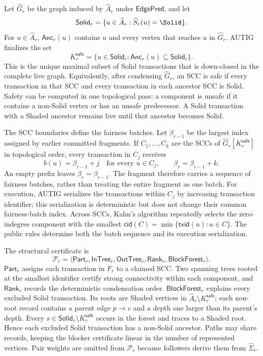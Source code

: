 Let $\widehat G_r$ be the graph induced by $\widehat A_r$ under
$\mathsf{EdgePred}$, and let
\[
 \mathsf{Solid}_r=\{u\in\widehat A_r:\widehat S_r(u)=\Solid\}.
\]
For $u\in\widehat A_r$, $\mathsf{Anc}_r(u)$ contains $u$ and every vertex
that reaches $u$ in $\widehat G_r$.  AUTIG finalizes the set
\[
 K_r^{\mathsf{safe}}
   =\{u\in\mathsf{Solid}_r:
          \mathsf{Anc}_r(u)\subseteq\mathsf{Solid}_r\}.
 \tag{11}\label{eq:safe-closure}
\]
This is the unique maximal subset of Solid transactions that is down-closed
in the complete live graph.  Equivalently, after condensing
$\widehat G_r$, an SCC is safe if every transaction in that SCC and every
transaction in each ancestor SCC is Solid.  Safety can be computed in one
topological pass: a component is unsafe if it contains a non-Solid vertex or
has an unsafe predecessor.  A Solid transaction with a Shaded ancestor
remains live until that ancestor becomes Solid.

The SCC boundaries define the fairness batches.  Let $\beta_{r-1}$ be the
largest index assigned by earlier committed fragments.  If
$C_1,\ldots,C_k$ are the SCCs of
$\widehat G_r[K_r^{\mathsf{safe}}]$ in topological order, every transaction in
$C_j$ receives
\[
 b(u)=\beta_{r-1}+j\quad\text{for every }u\in C_j,
 \qquad \beta_r=\beta_{r-1}+k.
\]
An empty prefix leaves $\beta_r=\beta_{r-1}$.  The fragment therefore carries
a sequence of fairness batches, rather than treating the entire fragment as
one batch.  For execution, AUTIG serializes the transactions within $C_j$ by
increasing transaction identifier; this serialization is deterministic but
does not change their common fairness-batch index.  Across SCCs, Kahn's
algorithm repeatedly selects the zero-indegree component with the smallest
$\mathsf{cid}(C)=\min\{\mathsf{txid}(u):u\in C\}$.  The public rules determine
both the batch sequence and its execution serialization.

The structural certificate is
\[
 \mathcal P_r=\langle\mathsf{Part}_r,\mathsf{InTree}_r,
 \mathsf{OutTree}_r,\mathsf{Rank}_r,\mathsf{BlockForest}_r\rangle.
 \tag{12}\label{eq:structural-proof-v4}
\]
$\mathsf{Part}_r$ assigns each transaction in $F_r$ to a claimed SCC.  Two
spanning trees rooted at the smallest identifier certify strong connectivity
within each component, and $\mathsf{Rank}_r$ records the deterministic
condensation order.  $\mathsf{BlockForest}_r$ explains every excluded Solid
transaction.  Its roots are Shaded vertices in
$\widehat A_r\setminus K_r^{\mathsf{safe}}$; each non-root record contains a
parent edge $p\to v$ and a depth one larger than its parent's depth.  Every
$s\in\mathsf{Solid}_r\setminus K_r^{\mathsf{safe}}$ occurs in the forest and
traces to a Shaded root.  Hence each excluded Solid transaction has a
non-Solid ancestor.  Paths may share records, keeping the blocker certificate
linear in the number of represented vertices.  Pair weights are omitted from
$\mathcal P_r$ because followers derive them from $\widehat\Sigma_r$.

